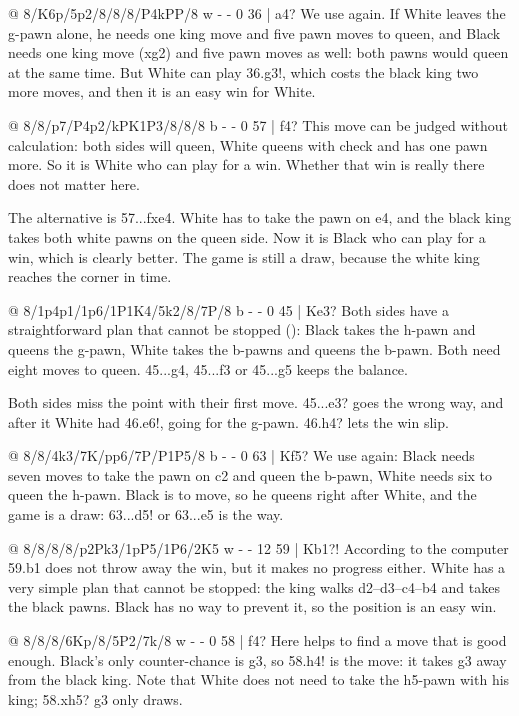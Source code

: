 @ 8/K6p/5p2/8/8/8/P4kPP/8 w - - 0 36 | a4?
We use  again. If White leaves the g-pawn alone, he
needs one king move and five pawn moves to queen, and Black needs one king move (\K xg2) and five
pawn moves as well: both pawns would queen at the same time. But White can play 36.g3!, which costs
the black king two more moves, and then it is an easy win for White.

@ 8/8/p7/P4p2/kPK1P3/8/8/8 b - - 0 57 | f4?
This move can be judged without calculation: both sides will queen, White queens with check and
has one pawn more. So it is White who can play for a win. Whether that win is really there does not
matter here.

The alternative is 57...fxe4. White has to take the pawn on e4, and the black king takes both white
pawns on the queen side. Now it is Black who can play for a win, which is clearly better. The game
is still a draw, because the white king reaches the corner in time.

@ 8/1p4p1/1p6/1P1K4/5k2/8/7P/8 b - - 0 45 | Ke3?
Both sides have a straightforward plan that cannot be stopped ():
Black takes the h-pawn and queens the g-pawn, White takes the b-pawns and queens the b-pawn. Both
need eight moves to queen. 45...\K g4, 45...\K f3 or 45...g5 keeps the balance.

Both sides miss the point with their first move. 45...\K e3? goes the wrong way, and after it
White had 46.\K e6!, going for the g-pawn. 46.h4? lets the win slip.

@ 8/8/4k3/7K/pp6/7P/P1P5/8 b - - 0 63 | Kf5?
We use  again: Black needs seven moves to take the pawn on
c2 and queen the b-pawn, White needs six to queen the h-pawn. Black is to move, so he queens right
after White, and the game is a draw: 63...\K d5! or 63...\K e5 is the way.

@ 8/8/8/8/p2Pk3/1pP5/1P6/2K5 w - - 12 59 | Kb1?!
According to the computer 59.\K b1 does not throw away the win, but it makes no progress either.
White has a very simple plan that cannot be stopped: the king walks d2--d3--c4--b4 and takes the
black pawns. Black has no way to prevent it, so the position is an easy win.

@ 8/8/8/6Kp/8/5P2/7k/8 w - - 0 58 | f4?
Here  helps to find a move that is good enough.
Black's only counter-chance is \K g3, so 58.\K h4! is the move: it takes g3 away from the black king.
Note that White does not need to take the h5-pawn with his king; 58.\K xh5? \K g3 only draws.

